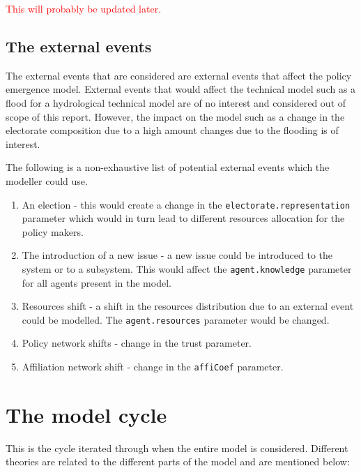 \textcolor{red}{This will probably be updated later.}


\subsection{The external events}

The external events that are considered are external events that affect the policy emergence model. External events that would affect the technical model such as a flood for a hydrological technical model are of no interest and considered out of scope of this report. However, the impact on the model such as a change in the electorate composition due to a high amount changes due to the flooding is of interest.

The following is a non-exhaustive list of potential external events which the modeller could use.

\begin{enumerate}
\item An election - this would create a change in the \texttt{electorate.representation} parameter which would in turn lead to different resources allocation for the policy makers.
\item The introduction of a new issue - a new issue could be introduced to the system or to a subsystem. This would affect the \texttt{agent.knowledge} parameter for all agents present in the model.
\item Resources shift - a shift in the resources distribution due to an external event could be modelled. The \texttt{agent.resources} parameter would be changed.
\item Policy network shifts - change in the trust parameter.
\item Affiliation network shift - change in the \texttt{affiCoef} parameter.
\end{enumerate}

\section{The model cycle}
\label{sec:modelCycle}

This is the cycle iterated through when the entire model is considered. Different theories are related to the different parts of the model and are mentioned below:

